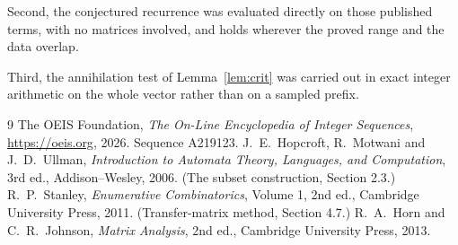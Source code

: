 \documentclass[11pt,a4paper]{article}
\theoremstyle{plain}
\theoremstyle{definition}
\begin{document}
Second, the conjectured recurrence was evaluated directly on those published terms, with no
matrices involved, and holds wherever the proved range and the data overlap.

Third, the annihilation test of Lemma~\ref{lem:crit} was carried out in exact integer
arithmetic on the whole vector rather than on a sampled prefix.

\begin{thebibliography}{9}
 The OEIS Foundation, \emph{The On-Line Encyclopedia of Integer
Sequences}, \url{https://oeis.org}, 2026. Sequence A219123.
 J.~E.~Hopcroft, R.~Motwani and J.~D.~Ullman, \emph{Introduction to Automata
Theory, Languages, and Computation}, 3rd ed., Addison--Wesley, 2006. (The subset
construction, Section 2.3.)
 R.~P.~Stanley, \emph{Enumerative Combinatorics}, Volume 1, 2nd ed.,
Cambridge University Press, 2011. (Transfer-matrix method, Section 4.7.)
 R.~A.~Horn and C.~R.~Johnson, \emph{Matrix Analysis}, 2nd ed., Cambridge
University Press, 2013.
\end{thebibliography}
\end{document}

